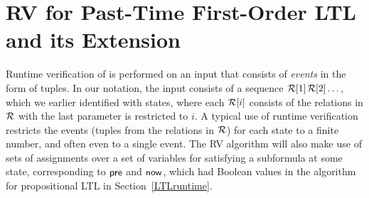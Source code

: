 
\section{RV for Past-Time
First-Order  LTL and its Extension}
\label{EPLTLRV}

Runtime verification of \FLTL{} is performed on an
input that consists of {\em events} in the form of
tuples. In our notation, the input
consists of a sequence ${\cal R}[1] \, {\cal R}[2]  \ldots$,
which we earlier identified with states, where each
${\cal R}[i]$ consists of the relations in
${\cal R}$ with
the last parameter is restricted to  $i$. A typical use
of runtime verification restricts the
events (tuples from the relations in ${\cal R}$) for
each state to a finite number, and often even to a single event.
The RV algorithm will also make
use of sets of assignments over a set of variables for satisfying a subformula at
some state, corresponding to $\mathsf{pre}$ and $\mathsf{now}$, which had Boolean values in the 
algorithm for propositional LTL in Section~\ref{LTLruntime}.



